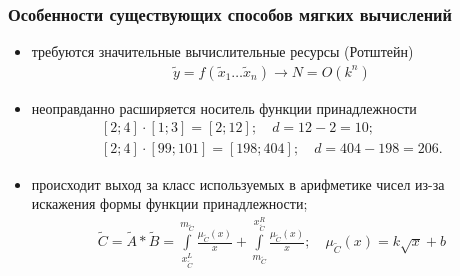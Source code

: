 \documentclass[12pt]{beamer}
\begin{document}
\begin{frame}
  \frametitle{Особенности существующих способов мягких вычислений}
  \begin{itemize}
    \item требуются значительные вычислительные ресурсы (Ротштейн)
    \begin{gather*}
      \tilde y = f \left(\tilde x_1 \ldots \tilde x_n \right) \rightarrow N = O\left( k^n \right)
    \end{gather*}
    
    \item неоправданно расширяется носитель функции принадлежности
\begin{equation*}
	\begin{matrix}
		\left[ 2;4 \right]\cdot \left[ 1;3 \right]=\left[ 2;12 \right];\quad d=12-2=10; \\ 
		\left[ 2;4 \right]\cdot \left[ 99;101 \right]=\left[ 198;404 \right];\quad d=404-198=206.
	\end{matrix}
\end{equation*}

    \item происходит выход за класс используемых в арифметике чисел из-за искажения формы функции принадлежности;
    \begin{gather*}
      \tilde{C}=\tilde{A}*\tilde{B}=\int\limits_{x_{{\tilde{C}}}^{L}}^{{{m}_{{\tilde{C}}}}}{\frac{{{\mu }_{{\tilde{C}}}}\left( x \right)}{x}}+\int\limits_{{{m}_{{\tilde{C}}}}}^{x_{{\tilde{C}}}^{R}}{\frac{{{\mu }_{{\tilde{C}}}}\left( x \right)}{x}}; \quad 
      \mu_{\tilde C}\left( x \right)=k\sqrt{x}+b
    \end{gather*}

  \end{itemize}
\end{frame}

\end{document}
